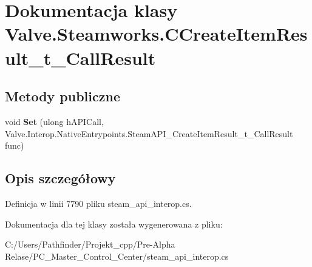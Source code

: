 \hypertarget{class_valve_1_1_steamworks_1_1_c_create_item_result__t___call_result}{}\section{Dokumentacja klasy Valve.\+Steamworks.\+C\+Create\+Item\+Result\+\_\+t\+\_\+\+Call\+Result}
\label{class_valve_1_1_steamworks_1_1_c_create_item_result__t___call_result}
\subsection*{Metody publiczne}
\begin{DoxyCompactItemize}
\item 
\mbox{\label{class_valve_1_1_steamworks_1_1_c_create_item_result__t___call_result_aea63f103305422c13f4a600bc6d8bca0}} 
void {\bfseries Set} (ulong h\+A\+P\+I\+Call, Valve.\+Interop.\+Native\+Entrypoints.\+Steam\+A\+P\+I\+\_\+\+Create\+Item\+Result\+\_\+t\+\_\+\+Call\+Result func)
\end{DoxyCompactItemize}


\subsection{Opis szczegółowy}


Definicja w linii 7790 pliku steam\+\_\+api\+\_\+interop.\+cs.



Dokumentacja dla tej klasy została wygenerowana z pliku\+:\begin{DoxyCompactItemize}
\item 
C\+:/\+Users/\+Pathfinder/\+Projekt\+\_\+cpp/\+Pre-\/\+Alpha Relase/\+P\+C\+\_\+\+Master\+\_\+\+Control\+\_\+\+Center/steam\+\_\+api\+\_\+interop.\+cs\end{DoxyCompactItemize}
